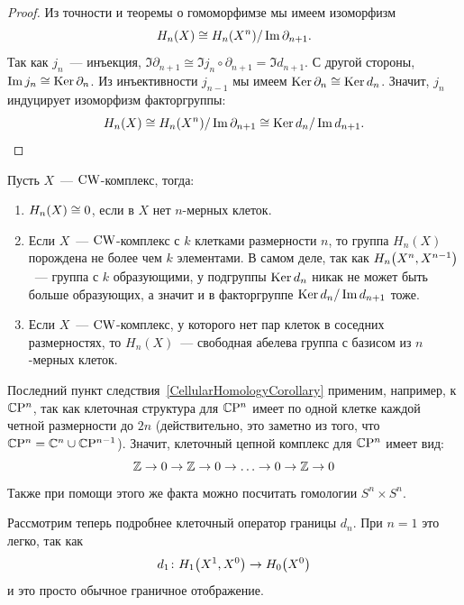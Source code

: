     \begin{proof}
        Из точности и теоремы о гомоморфимзе мы имеем изоморфизм
        \[ H_{n}(X) \cong H_{n}\lr*{X^n}/\Im{\partial_{n + 1}}.\]
        Так как $j_n$~--- инъекция, $\Im{\partial_{n + 1}} \cong \Im{j_n \circ \partial_{n + 1}} = \Im{d_{n + 1}}$.
        С другой стороны, $\mathop{\mathrm{Im}}\nolimits{j_n} \cong \operatorname{Ker}{\partial_n}$. Из инъективности $j_{n - 1}$ мы имеем $\operatorname{Ker}{\partial_n} \cong \operatorname{Ker}{d_n}$.
        Значит, $j_n$ индуцирует изоморфизм факторгруппы:
        \[ H_{n}(X) \cong H_{n}\lr*{X^n}/\Im{\partial_{n + 1}} \cong \Ker{d_n}/\Im{d_{n + 1}}. \]
    \end{proof}

    \begin{corollary}\label{CellularHomologyCorollary}
        Пусть $X$~--- $\operatorname{CW}$-комплекс, тогда:
        \begin{enumerate}
            \item $H_{n}\lr*{X} \cong 0$, если в $X$ нет $n$-мерных клеток.
            \item Если $X$~--- $\operatorname{CW}$-комплекс с $k$ клетками размерности $n$, то группа $H_{n}(X)$ порождена не более чем $k$ элементами.
                В самом деле, так как $H_{n}\lr*{X^n, X^{n - 1}}$~--- группа с $k$ образующими, у подгруппы $\operatorname{Ker}{d_n}$ никак не может быть больше образующих, а значит и в факторгруппе
                $\operatorname{Ker}{d_n}/\mathop{\mathrm{Im}}\nolimits{d_{n + 1}}$ тоже.
            \item Если $X$~--- $\operatorname{CW}$-комплекс, у которого нет пар клеток в соседних размерностях, то $H_{n}(X)$~--- свободная абелева группа с базисом из $n$-мерных клеток.
        \end{enumerate}
    \end{corollary}

    \begin{example}
        Последний пункт следствия~\ref{CellularHomologyCorollary} применим, например, к $\mathbb{C} \mathrm{P}^n$, так как клеточная структура для $\mathbb{C} \mathrm{P}^n$
        имеет по одной клетке каждой четной размерности до $2n$ (действительно, это заметно из того, что $\mathbb{C} \mathrm{P}^n = \mathbb{C}^n \cup \mathbb{C} \mathrm{P}^{n - 1}$). Значит, клеточный цепной комплекс для $\mathbb{C} \mathrm{P}^n$ имеет вид:
        \[ \mathbb{Z} \to 0 \to \mathbb{Z} \to 0 \to \ldots \to 0 \to \mathbb{Z} \to 0 \]
        Также при помощи этого же факта можно посчитать гомологии $S^n \times S^n$.
    \end{example}

    Рассмотрим теперь подробнее клеточный оператор границы $d_n$. При $n = 1$ это легко, так как
    \[ d_1\colon H_{1}\lr*{X^1, X^0} \to H_{0}\lr*{X^0}\]
    и это просто обычное граничное отображение.


